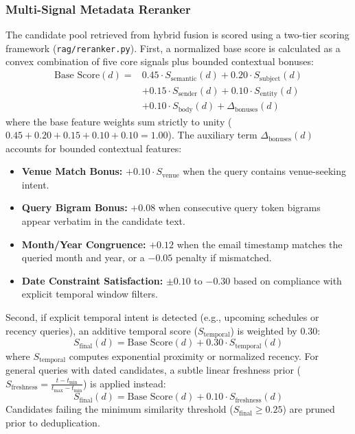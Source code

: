 \documentclass[11pt,a4paper]{article}
\begin{document}
\subsubsection{Multi-Signal Metadata Reranker}
The candidate pool retrieved from hybrid fusion is scored using a two-tier scoring framework (\texttt{rag/reranker.py}). First, a normalized base score is calculated as a convex combination of five core signals plus bounded contextual bonuses:
\begin{equation}
\label{eq:base_score}
\begin{aligned}
    \text{Base Score}(d) ={} & 0.45 \cdot S_{\text{semantic}}(d) + 0.20 \cdot S_{\text{subject}}(d) \\
    & + 0.15 \cdot S_{\text{sender}}(d) + 0.10 \cdot S_{\text{entity}}(d) \\
    & + 0.10 \cdot S_{\text{body}}(d) + \Delta_{\text{bonuses}}(d)
\end{aligned}
\end{equation}
where the base feature weights sum strictly to unity ($0.45 + 0.20 + 0.15 + 0.10 + 0.10 = 1.00$). The auxiliary term $\Delta_{\text{bonuses}}(d)$ accounts for bounded contextual features:
\begin{itemize}
    \item \textbf{Venue Match Bonus:} $+0.10 \cdot S_{\text{venue}}$ when the query contains venue-seeking intent.
    \item \textbf{Query Bigram Bonus:} $+0.08$ when consecutive query token bigrams appear verbatim in the candidate text.
    \item \textbf{Month/Year Congruence:} $+0.12$ when the email timestamp matches the queried month and year, or a $-0.05$ penalty if mismatched.
    \item \textbf{Date Constraint Satisfaction:} $\pm 0.10$ to $-0.30$ based on compliance with explicit temporal window filters.
\end{itemize}

Second, if explicit temporal intent is detected (e.g., upcoming schedules or recency queries), an additive temporal score ($S_{\text{temporal}}$) is weighted by $0.30$:
\begin{equation}
\label{eq:rerank_temporal}
    S_{\text{final}}(d) = \text{Base Score}(d) + 0.30 \cdot S_{\text{temporal}}(d)
\end{equation}
where $S_{\text{temporal}}$ computes exponential proximity or normalized recency. For general queries with dated candidates, a subtle linear freshness prior ($S_{\text{freshness}} = \frac{t - t_{\min}}{t_{\max} - t_{\min}}$) is applied instead:
\begin{equation}
\label{eq:rerank_freshness}
    S_{\text{final}}(d) = \text{Base Score}(d) + 0.10 \cdot S_{\text{freshness}}(d)
\end{equation}
Candidates failing the minimum similarity threshold ($S_{\text{final}} \ge 0.25$) are pruned prior to deduplication.
\end{document}
